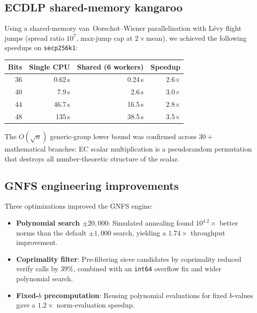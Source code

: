 \documentclass[12pt]{amsart}
\theoremstyle{definition}
\theoremstyle{remark}
\begin{document}
\subsection{ECDLP shared-memory kangaroo}

Using a shared-memory van~Oorschot--Wiener parallelization with L\'evy flight
jumps (spread ratio $10^{7}$, max-jump cap at $2\times$mean), we achieved the
following speedups on \texttt{secp256k1}:

\begin{center}
\begin{tabular}{@{}rrrr@{}}
\toprule
Bits & Single CPU & Shared (6 workers) & Speedup \\
\midrule
36 & 0.62\,s & 0.24\,s & 2.6$\times$ \\
40 & 7.9\,s & 2.6\,s & 3.0$\times$ \\
44 & 46.7\,s & 16.5\,s & 2.8$\times$ \\
48 & 135\,s & 38.5\,s & 3.5$\times$ \\
\bottomrule
\end{tabular}
\end{center}

\noindent
The $O(\sqrt{n})$ generic-group lower bound was confirmed across $30+$
mathematical branches: EC scalar multiplication is a pseudorandom permutation
that destroys all number-theoretic structure of the scalar.

\subsection{GNFS engineering improvements}

Three optimizations improved the GNFS engine:
\begin{itemize}
  \item \textbf{Polynomial search $\pm20{,}000$}: Simulated annealing found
    $10^{4.2}\times$ better norms than the default $\pm1{,}000$ search,
    yielding a $1.74\times$ throughput improvement.
  \item \textbf{Coprimality filter}: Pre-filtering sieve candidates by
    coprimality reduced verify calls by $39\%$, combined with an \texttt{int64}
    overflow fix and wider polynomial search.
  \item \textbf{Fixed-$b$ precomputation}: Reusing polynomial evaluations for
    fixed $b$-values gave a $1.2\times$ norm-evaluation speedup.
\end{itemize}

\end{document}
